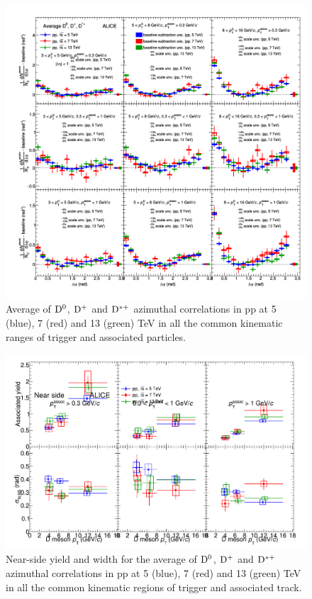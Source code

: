 \begin{figure}
\centering
\includegraphics[width=1.1\textwidth, angle=270]{figures/ComparisonToOtherpp/plotComparison_WeightedAverage_pp_vsEnergies_UniqueCanvas_Style1.png}
\caption{Average of ${\rm D^0}$, ${\rm D^+}$ and ${\rm D^{*+}}$ azimuthal correlations in pp at 5 (blue), 7 (red) and 13 (green) TeV in all the common kinematic ranges of trigger and associated particles.}
\label{fig:Allpp}
\end{figure}

\begin{figure}
\centering
\includegraphics[width=.96\textwidth]{figures/ComparisonToOtherpp/CompareFitResults_DiffppEnergies.png}
\caption{Near-side yield and width for the average of ${\rm D^0}$, ${\rm D^+}$ and ${\rm D^{*+}}$ azimuthal correlations in pp at 5 (blue), 7 (red) and 13 (green) TeV in all the common kinematic regions of trigger and associated track.}
\label{fig:AllppFit1}
\end{figure}


